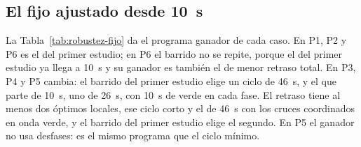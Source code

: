 \subsection*{El fijo ajustado desde 10~s}

La Tabla~\ref{tab:robustez-fijo} da el programa ganador de cada caso. En
P1, P2 y P6 es el del primer estudio; en P6 el barrido no se repite,
porque el del primer estudio ya llega a 10~s y su ganador es también
el de menor retraso total. En P3, P4 y P5 cambia: el barrido del primer
estudio elige un ciclo de 46~s, y el que parte de 10~s, uno de 26~s,
con 10~s de verde en cada fase. El retraso tiene al menos dos óptimos
locales, ese ciclo corto y el de 46~s con los cruces coordinados en
onda verde, y el barrido del primer estudio elige el segundo. En P5 el
ganador no usa desfases: es el mismo programa que el ciclo mínimo.

